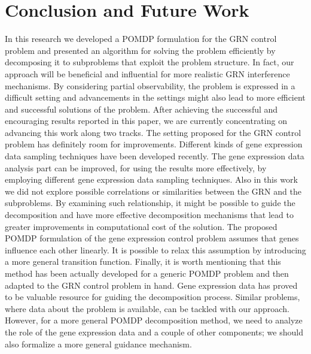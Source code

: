 \chapter{Conclusion and Future Work}
\label{chapter:conclusion}

In this research we developed a POMDP formulation for the GRN control problem and presented an algorithm for
solving the problem efficiently by decomposing it to subproblems that exploit the problem structure. In fact,
our approach will be beneficial and influential for more realistic GRN interference mechanisms. By
considering partial observability, the problem is expressed in a difficult setting and advancements in the
settings might also lead to more efficient and successful solutions of the problem.%
After achieving the successful and encouraging results reported in this paper, we are currently concentrating
on advancing this work along two tracks. The setting proposed for the GRN control problem has definitely room
for improvements. Different kinds of gene expression data sampling techniques have been developed recently.
The gene expression data analysis part can be improved, for using the results more effectively, by employing
different gene expression data sampling techniques. Also in this work we did not explore possible
correlations or similarities between the GRN and the subproblems. By examining such relationship, it might be
possible to guide the decomposition and have more effective decomposition mechanisms that lead to greater
improvements in computational cost of the solution. The proposed POMDP formulation of the gene expression control problem
assumes that genes influence each other linearly. It is possible to relax this assumption by introducing a
more general transition function. Finally, it is worth mentioning that this method has been
actually developed for a generic POMDP problem and then adapted to the GRN control problem in hand. Gene
expression data has proved to be valuable resource for guiding the decomposition process. Similar problems,
where data about the problem is available, can be tackled with our approach. However, for a more general
POMDP decomposition method, we need to analyze the role of the gene expression data and a couple of other
components; we should also formalize a more general guidance mechanism.

